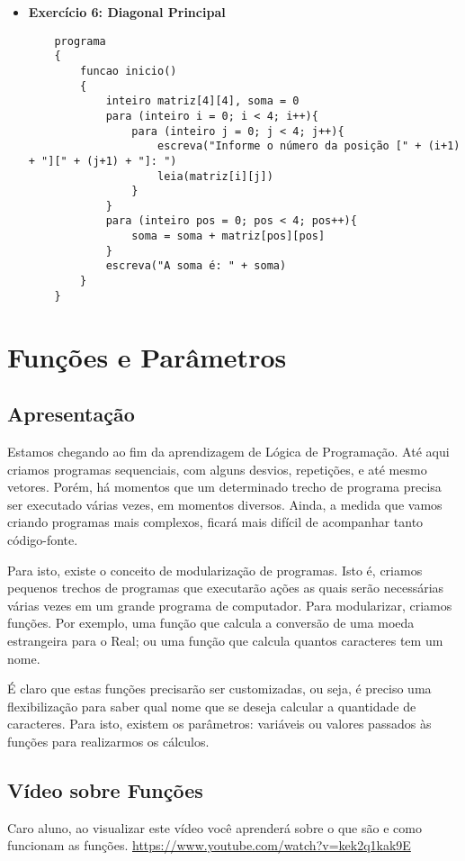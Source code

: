 \documentclass{article}
\begin{document}
\begin{itemize}
    \item \textbf{Exercício 6: Diagonal Principal}
    \begin{lstlisting}
    programa
    {
        funcao inicio()
        {
            inteiro matriz[4][4], soma = 0
            para (inteiro i = 0; i < 4; i++){
                para (inteiro j = 0; j < 4; j++){
                    escreva("Informe o número da posição [" + (i+1) + "][" + (j+1) + "]: ")
                    leia(matriz[i][j])
                }
            }
            para (inteiro pos = 0; pos < 4; pos++){
                soma = soma + matriz[pos][pos]
            }
            escreva("A soma é: " + soma)
        }
    }
    \end{lstlisting}
\end{itemize}


\section{Funções e Parâmetros}
\subsection{Apresentação}
Estamos chegando ao fim da aprendizagem de Lógica de Programação. Até aqui criamos programas sequenciais, com alguns desvios, repetições, e até mesmo vetores. Porém, há momentos que um determinado trecho de programa precisa ser executado várias vezes, em momentos diversos. Ainda, a medida que vamos criando programas mais complexos, ficará mais difícil de acompanhar tanto código-fonte.

Para isto, existe o conceito de modularização de programas. Isto é, criamos pequenos trechos de programas que executarão ações as quais serão necessárias várias vezes em um grande programa de computador. Para modularizar, criamos funções. Por exemplo, uma função que calcula a conversão de uma moeda estrangeira para o Real; ou uma função que calcula quantos caracteres tem um nome.

É claro que estas funções precisarão ser customizadas, ou seja, é preciso uma flexibilização para saber qual nome que se deseja calcular a quantidade de caracteres. Para isto, existem os parâmetros: variáveis ou valores passados às funções para realizarmos os cálculos.

\subsection{Vídeo sobre Funções}
Caro aluno, ao visualizar este vídeo você aprenderá sobre o que são e como funcionam as funções.
\href{https://www.youtube.com/watch?v=kek2q1kak9E}{https://www.youtube.com/watch?v=kek2q1kak9E}
\end{document}
